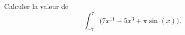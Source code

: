 \begin{exercice}\label{exoLCexoMatlab0005}

Calculer la valeur de
\begin{equation}
       \nonumber \int_{-7}^7\big( 7x^{11}-5x^3+\pi\sin(x) \big).
\end{equation}

\end{exercice}
